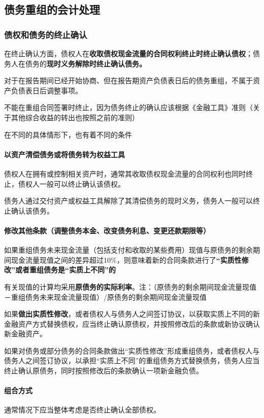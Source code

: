 \documentclass[UTF8,12pt]{ctexart}
\numberwithin{equation}{section} %
\numberwithin{figure}{section}
\numberwithin{table}{section}
\begin{document}
	\subsection{债务重组的会计处理}
	\subsubsection{债权和债务的终止确认}
	在终止确认方面，债权人在\textbf{收取债权现金流量的合同权利终止时终止确认债权}；债务人在债务的\textbf{现时义务解除时终止确认债务。}
	
	对于在报告期间已经开始协商、但在报告期资产负债表日后的债务重组，不属于资产负债表日后调整事项。

	不能在重组合同签署时终止，因为债务终止的确认应该根据《金融工具》准则（关于其他综合收益的转出也按照之前的准则）
	
	在不同的具体情形下，也有着不同的条件
	\paragraph{以资产清偿债务或将债务转为权益工具}
	债权人在拥有或控制相关资产时，通常其收取债权现金流量的合同权利也同时终止，债权人一般可以终止确认该债权。
	
	债务人通过交付资产或权益工具解除了其清偿债务的现时义务，债务人一般可以终止确认该债务。
	
	\paragraph{修改其他条款（调整债务本金、改变债务利息、变更还款期限等）}
	如果重组债务未来现金流量（包括支付和收取的某些费用）现值与原债务的剩余期间现金流量现值之间的差异超过10\%，则意味着新的合同条款进行了\textbf{“实质性修改”或者重组债务是“实质上不同”的}
	
	有关现值的计算均采用\textbf{原债务的实际利率}。注：（原债务的剩余期间现金流量现值－重组债务未来现金流量现值）/原债务的剩余期间现金流量现值
	
	如果\textbf{做出实质性修改}，或者债权人与债务人之间签订协议，以获取实质上不同的新金融资产方式替换债权，应当终止确认原债权，并按照修改后的条款或新协议确认新金融资产。
	
	如果对债务或部分债务的合同条款做出“实质性修改”形成重组债务，或者债权人与债务人之间签订协议，以承担“实质上不同”的重组债务方式替换债务，债务人应当终止确认原债务，同时按照修改后的条款确认一项新金融负债。
	
	\paragraph{组合方式}
	通常情况下应当整体考虑是否终止确认全部债权。
	
\end{document}
